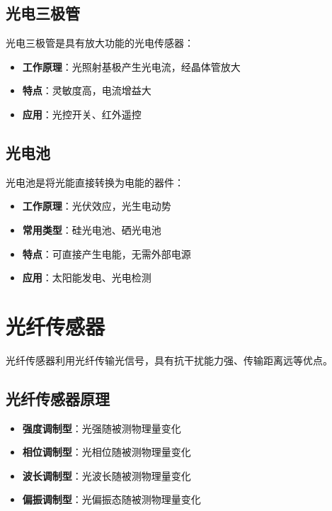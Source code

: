 \documentclass[12pt,UTF8]{ctexbook}
\begin{document}
\subsection{光电三极管}

光电三极管是具有放大功能的光电传感器：

\begin{itemize}[leftmargin=2cm]
	\item \textbf{工作原理}：光照射基极产生光电流，经晶体管放大
	\item \textbf{特点}：灵敏度高，电流增益大
	\item \textbf{应用}：光控开关、红外遥控
\end{itemize}

\subsection{光电池}

光电池是将光能直接转换为电能的器件：

\begin{itemize}[leftmargin=2cm]
	\item \textbf{工作原理}：光伏效应，光生电动势
	\item \textbf{常用类型}：硅光电池、硒光电池
	\item \textbf{特点}：可直接产生电能，无需外部电源
	\item \textbf{应用}：太阳能发电、光电检测
\end{itemize}

\section{光纤传感器}

光纤传感器利用光纤传输光信号，具有抗干扰能力强、传输距离远等优点。

\subsection{光纤传感器原理}

\begin{itemize}[leftmargin=2cm]
	\item \textbf{强度调制型}：光强随被测物理量变化
	\item \textbf{相位调制型}：光相位随被测物理量变化
	\item \textbf{波长调制型}：光波长随被测物理量变化
	\item \textbf{偏振调制型}：光偏振态随被测物理量变化
\end{itemize}
\end{document}
